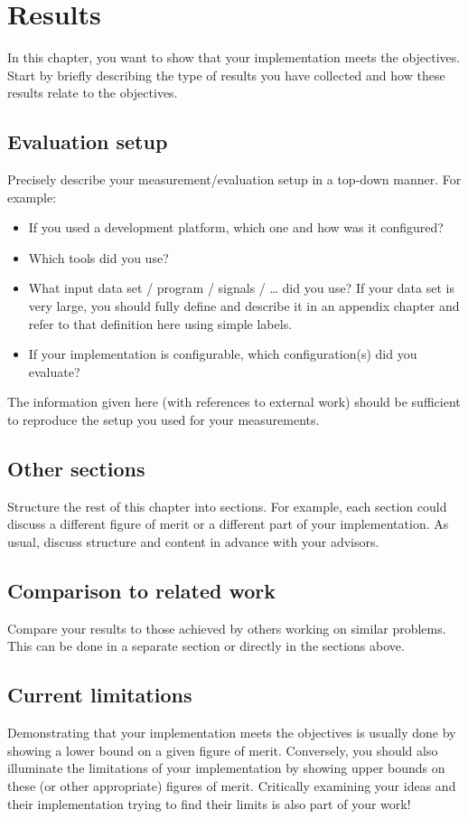 \chapter{Results}
\label{ch:results}

In this chapter, you want to show that your implementation meets the objectives.
Start by briefly describing the type of results you have collected and how these results relate to the objectives.

\section{Evaluation setup}

Precisely describe your measurement/evaluation setup in a top-down manner.
For example:
\begin{itemize}
  \item If you used a development platform, which one and how was it configured?
  \item Which tools did you use?
  \item What input data set / program / signals / \ldots{} did you use?
    If your data set is very large, you should fully define and describe it in an appendix chapter and refer to that definition here using simple labels.
  \item If your implementation is configurable, which configuration(s) did you evaluate?
\end{itemize}

The information given here (with references to external work) should be sufficient to reproduce the setup you used for your measurements.

\section{Other sections}

Structure the rest of this chapter into sections.
For example, each section could discuss a different figure of merit or a different part of your implementation.
As usual, discuss structure and content in advance with your advisors.

\section{Comparison to related work}

Compare your results to those achieved by others working on similar problems.
This can be done in a separate section or directly in the sections above.

\section{Current limitations}

Demonstrating that your implementation meets the objectives is usually done by showing a lower bound on a given figure of merit.
Conversely, you should also illuminate the limitations of your implementation by showing upper bounds on these (or other appropriate) figures of merit.
Critically examining your ideas and their implementation trying to find their limits is also part of your work!

